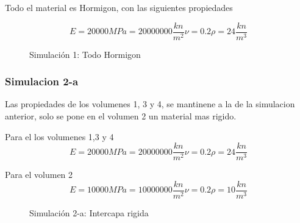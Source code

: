\documentclass[12pt, a4paper]{article}
\begin{document}
Todo el material es Hormigon, con las siguientes propiedades

\begin{equation*}
	E=20000 MPa = 20000000 \frac{kn}{m^2}
	\nu = 0.2
	\rho = 24 \frac{kn}{m^3}
\end{equation*}
 
\begin{figure}[h]
	\centering
	\caption{Simulación 1: Todo Hormigon}
\end{figure}

\subsubsection{Simulacion 2-a}

Las propiedades de los volumenes 1, 3 y 4, se mantinene a la de la simulacion anterior, solo se pone en el volumen 2 un material mas rigido.

Para el los volumenes 1,3 y 4
\begin{equation*}
	E=20000 MPa = 20000000 \frac{kn}{m^2}
	\nu = 0.2
	\rho = 24 \frac{kn}{m^3}
\end{equation*}

Para el volumen 2
\begin{equation*}
	E=10000 MPa = 10000000 \frac{kn}{m^2}
	\nu = 0.2
	\rho = 10 \frac{kn}{m^3}
\end{equation*}

\begin{figure}[h]
	\centering
	\caption{Simulación 2-a: Intercapa rigida}
\end{figure}
\end{document}
